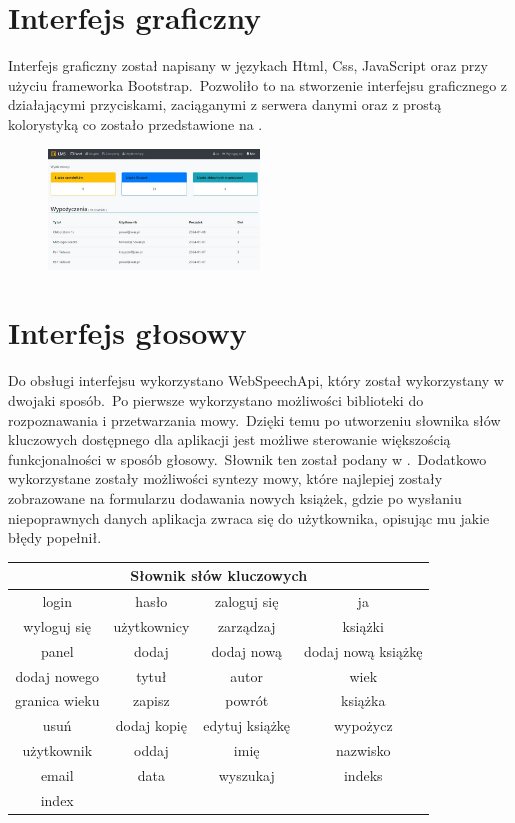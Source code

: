 \section{Interfejs graficzny}
Interfejs graficzny został napisany w językach Html, Css, JavaScript oraz przy użyciu frameworka Bootstrap.\ Pozwoliło to na stworzenie interfejsu graficznego z działającymi przyciskami, zaciąganymi z serwera danymi oraz z prostą kolorystyką co zostało przedstawione na .

\begin{figure}[H]
    \centering
    \includegraphics[width=0.5\textwidth]{images/gui}
    \label{fig:gui}
\end{figure}

\section{Interfejs głosowy}
Do obsługi interfejsu wykorzystano WebSpeechApi, który został wykorzystany w dwojaki sposób.\ Po pierwsze wykorzystano możliwości biblioteki do rozpoznawania i przetwarzania mowy.\ Dzięki temu po utworzeniu słownika słów kluczowych dostępnego dla aplikacji jest możliwe sterowanie większością funkcjonalności w sposób głosowy.\ Słownik ten został podany w .\ Dodatkowo wykorzystane zostały możliwości syntezy mowy, które najlepiej zostały zobrazowane na formularzu dodawania nowych książek, gdzie po wysłaniu niepoprawnych danych aplikacja zwraca się do użytkownika, opisując mu jakie błędy popełnił.

\begin{table}[H]
    \centering
    \label{tab:keys}
\begin{tabular}{|c|c|c|c|} \hline
    \multicolumn{4}{|c|}{\textbf{Słownik słów kluczowych}} \\ \hline
    login & hasło & zaloguj się & ja \\ \hline
    wyloguj się & użytkownicy & zarządzaj & książki \\ \hline
    panel & dodaj & dodaj nową & dodaj nową książkę \\ \hline
    dodaj nowego & tytuł & autor & wiek \\ \hline
    granica wieku & zapisz & powrót & książka \\ \hline
    usuń & dodaj kopię & edytuj książkę & wypożycz \\ \hline
    użytkownik & oddaj & imię & nazwisko \\ \hline
    email & data & wyszukaj & indeks \\ \hline
    index & & & \\ \hline
\end{tabular}
\end{table}